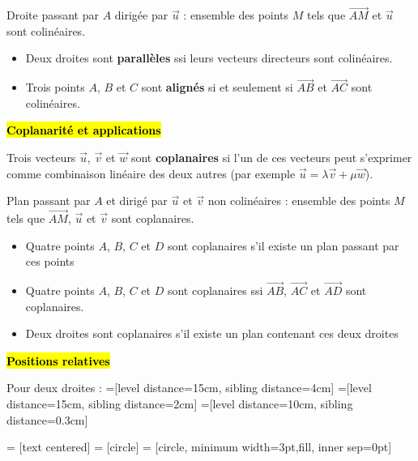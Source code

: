 \documentclass[10pt,fleqn, openany, landscape, twocolumn]{book} %
\begin{document}
Droite passant par $A$ dirigée par $\vec u$ : ensemble des points $M$ tels que $\overrightarrow{AM}$ et $\vec u$ sont colinéaires.
\begin{itemize}
\item Deux droites sont \textbf{parallèles} ssi leurs vecteurs directeurs sont colinéaires.
\item Trois points $A$, $B$ et $C$ sont \textbf{alignés} si et seulement si $\overrightarrow{AB}$ et $\overrightarrow{AC}$ sont colinéaires.
\end{itemize}



\hl{\textbf{Coplanarité et applications}}

Trois vecteurs $\vec u$, $\vec v$ et $\vec w$ sont \textbf{coplanaires} si l'un de ces vecteurs peut s'exprimer comme combinaison linéaire des deux autres (par exemple $\vec u =\lambda \vec v + \mu \vec w$).

Plan passant par $A$ et dirigé par $\vec u$ et $\vec v$ non colinéaires : ensemble des points $M$ tels que $\overrightarrow{AM}$, $\vec u$ et $\vec v$ sont coplanaires.
\begin{itemize}
\item Quatre points $A$, $B$, $C$ et $D$ sont coplanaires s'il existe un plan passant par ces points
\item Quatre points $A$, $B$, $C$ et $D$ sont coplanaires ssi $\overrightarrow{AB}$, $\overrightarrow{AC}$ et $\overrightarrow{AD}$ sont coplanaires.
\item Deux droites sont coplanaires s'il existe un plan contenant ces deux droites
\end{itemize}

\hl{\textbf{Positions relatives}}

Pour deux droites :
\vspace{-1cm}
=[level distance=15cm, sibling distance=4cm]
=[level distance=15cm, sibling distance=2cm]
=[level distance=10cm, sibling distance=0.3cm]

 = [text centered]
 = [circle]
 = [circle, minimum width=3pt,fill, inner sep=0pt]
\begin{center}
\end{center}
\end{document}
